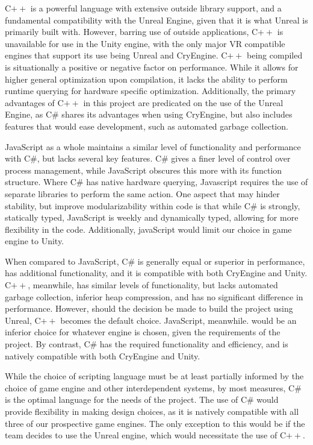 \documentclass[onecolumn, draftclsnofoot,10pt, compsoc]{IEEEtran}
\newcounter{threesection}[subsubsection]
\newcounter{foursection}[threesection]
\begin{document}
C$++$ is a powerful language with extensive outside library support, and a fundamental compatibility with the Unreal Engine, given that it is what Unreal is primarily built with. However, barring use of outside applications, C$++$ is unavailable for use in the Unity engine, with the only major VR compatible engines that support its use being Unreal and CryEngine. C$++$ being compiled is situationally a positive or negative factor on performance. While it allows for higher general optimization upon compilation, it lacks the ability to perform runtime querying for hardware specific optimization. Additionally, the primary advantages of C$++$ in this project are predicated on the use of the Unreal Engine, as C\# shares its advantages when using CryEngine, but also includes features that would ease development, such as automated garbage collection.\cite{richTech3}

JavaScript as a whole maintains a similar level of functionality and performance with C\#, but lacks several key features. C\# gives a finer level of control over process management, while JavaScript obscures this more with its function structure. Where C\# has native hardware querying, Javascript requires the use of separate libraries to perform the same action. One aspect that may hinder stability, but improve modularizability within code is that while C\# is strongly, statically typed, JavaScript is weekly and dynamically typed, allowing for more flexibility in the code. Additionally, javaScript would limit our choice in game engine to Unity.

When compared to JavaScript, C\# is generally equal or superior in performance, has additional functionality, and it is compatible with both CryEngine and Unity. C$++$, meanwhile, has similar levels of functionality, but lacks automated garbage collection, inferior heap compression, and has no significant difference in performance. However, should the decision be made to build the project using Unreal, C$++$ becomes the default choice. JavaScript, meanwhile. would be an inferior choice for whatever engine is chosen, given the requirements of the project. By contrast, C\# has the required functionality and efficiency, and is natively compatible with both CryEngine and Unity. 

While the choice of scripting language must be at least partially informed by the choice of game engine and other interdependent systems, by most measures, C\# is the optimal language for the needs of the project. The use of C\# would provide flexibility in making design choices, as it is natively compatible with all three of our prospective game engines. The only exception to this would be if the team decides to use the Unreal engine, which would necessitate the use of C$++$.
\end{document}
